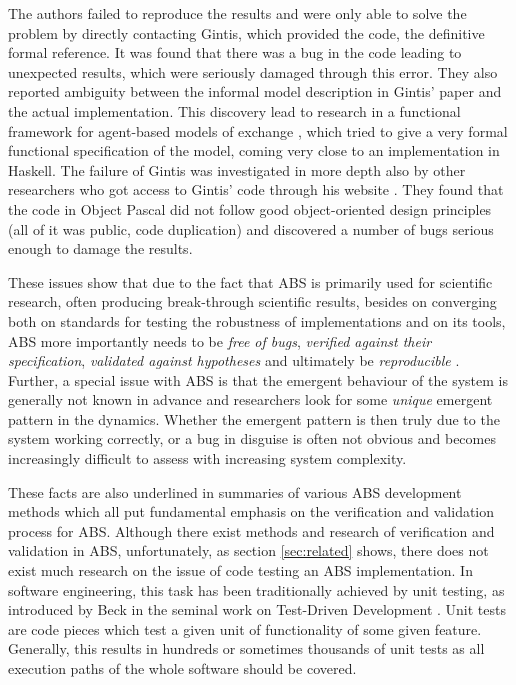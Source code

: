 The authors \cite{botta2013mathematical} failed to reproduce the results and were only able to solve the problem by directly contacting Gintis, which provided the code, the definitive formal reference. It was found that there was a bug in the code leading to unexpected results, which were seriously damaged through this error. They also reported ambiguity between the informal model description in Gintis' paper and the actual implementation. This discovery lead to research in a functional framework for agent-based models of exchange \cite{botta_functional_2011}, which tried to give a very formal functional specification of the model, coming very close to an implementation in Haskell. The failure of Gintis was investigated in more depth also by other researchers \cite{evensen_extensible_2010} who got access to Gintis' code through his website \cite{gintis_herbert_website}. They found that the code in Object Pascal did not follow good object-oriented design principles (all of it was public, code duplication) and discovered a number of bugs serious enough to damage the results.

These issues show that due to the fact that ABS is primarily used for scientific research, often producing break-through scientific results, besides on converging both on standards for testing the robustness of implementations and on its tools, ABS more importantly needs to be \textit{free of bugs}, \textit{verified against their specification}, \textit{validated against hypotheses} and ultimately be \textit{reproducible} \cite{axelrod_chapter_2006}. Further, a special issue with ABS is that the emergent behaviour of the system is generally not known in advance and researchers look for some \textit{unique} emergent pattern in the dynamics. Whether the emergent pattern is then truly due to the system working correctly, or a bug in disguise is often not obvious and becomes increasingly difficult to assess with increasing system complexity. 

These facts are also underlined in summaries of various ABS development methods \cite{hammer_tongs_north_2018} which all put fundamental emphasis on the verification and validation process for ABS. Although there exist methods and research of verification and validation in ABS, unfortunately, as section \ref{sec:related} shows, there does not exist much research on the issue of code testing an ABS implementation. In software engineering, this task has been traditionally achieved by unit testing, as introduced by Beck in the seminal work on Test-Driven Development \cite{beck_test_2002}. Unit tests are code pieces which test a given unit of functionality of some given feature. Generally, this results in hundreds or sometimes thousands of unit tests as all execution paths of the whole software should be covered.

